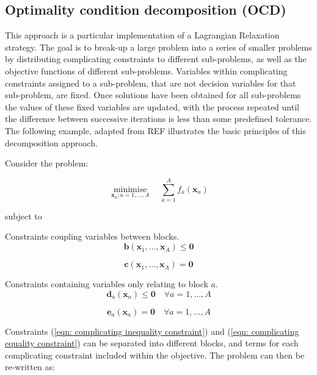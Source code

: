 \documentclass{article}
\DeclareMathOperator*{\minimise}{minimise}
\begin{document}
\subsection{Optimality condition decomposition (OCD)}
This approach is a particular implementation of a Lagrangian Relaxation strategy. The goal is to break-up a large problem into a series of smaller problems by distributing complicating constraints to different sub-problems, as well as the objective functions of different sub-problems. Variables within complicating constraints assigned to a sub-problem, that are not decision variables for that sub-problem, are fixed. Once solutions have been obtained for all sub-problems the values of these fixed variables are updated, with the process repeated until the difference between successive iterations is less than some predefined tolerance. The following example, adapted from REF illustrates the basic principles of this decomposition approach.

Consider the problem:

\begin{equation}
	\minimise\limits_{\bm{x}_{a}; a=1,\ldots, A} \quad \sum\limits_{a=1}^{A}f_{a}(\bm{x}_{a})
\end{equation}

subject to

Constraints coupling variables between blocks.
\begin{equation}
	\bm{b}\left(\bm{x}_{1}, \ldots, \bm{x}_{A}\right) \leq \bm{0}
	\label{eqn: complicating inequality constraint}
\end{equation}

\begin{equation}
	\bm{c}\left(\bm{x}_{1}, \ldots, \bm{x}_{A}\right) = \bm{0}
	\label{eqn: complicating equality constraint}
\end{equation}

Constraints containing variables only relating to block $a$.
\begin{equation}
	\bm{d}_{a}\left(\bm{x}_{a}\right) \leq \bm{0} \quad \forall a = 1,\ldots,A
\end{equation}

\begin{equation}
	\bm{e}_{a}\left(\bm{x}_{a}\right) = \bm{0} \quad \forall a = 1,\ldots,A
\end{equation}

Constraints (\ref{eqn: complicating inequality constraint}) and (\ref{eqn: complicating equality constraint}) can be separated into different blocks, and terms for each complicating constraint included within the objective. The problem can then be re-written as:
\end{document}
